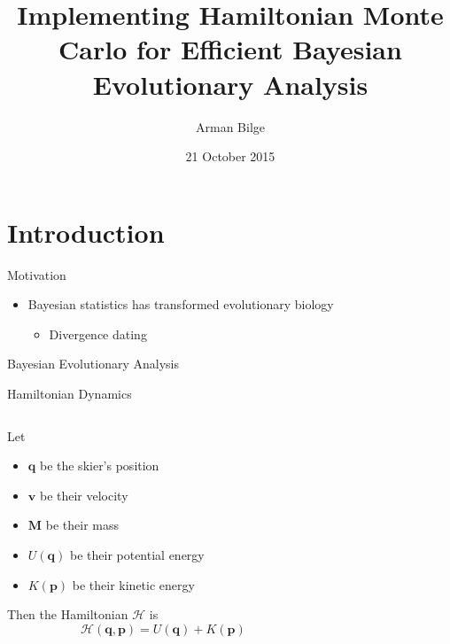 \documentclass{beamer}
\title{Implementing Hamiltonian Monte Carlo for Efficient Bayesian Evolutionary Analysis}
\author{Arman Bilge}
\institute{Computational Evolution Group \\ The University of Auckland}
\date{21 October 2015}
\renewcommand{\vec}[1]{\ensuremath{\boldsymbol{\mathbf{#1}}}}
\newcommand{\mat}[1]{\ensuremath{\boldsymbol{\mathbf{#1}}}}
\begin{document}
    \frame{\titlepage}

    \section{Introduction}

    \begin{frame}{Motivation}

        \begin{itemize}

            \item Bayesian statistics has transformed evolutionary biology
            \begin{itemize}
                \item Divergence dating
            \end{itemize}

        \end{itemize}

    \end{frame}

    \begin{frame}{Bayesian Evolutionary Analysis}
    \end{frame}

    \begin{frame}{Hamiltonian Dynamics}
        \begin{columns}
            \begin{column}{.5\textwidth}
                \begin{definition}
                    Let
                    \small
                    \begin{itemize}
                        \item $\vec{q}$ be the skier's position
                        \item $\vec{v}$ be their velocity
                        \item $\mat{M}$ be their mass
                        \item $U\left(\vec{q}\right)$ be their potential energy
                        \item $K\left(\vec{p}\right)$ be their kinetic energy
                    \end{itemize}

                    \normalsize
                    Then the Hamiltonian $\mathcal{H}$ is
                    \begin{equation*}
                        \mathcal{H}\left(\vec{q},\vec{p}\right) = U\left(\vec{q}\right) + K\left(\vec{p}\right)
                    \end{equation*}
                \end{definition}
            \end{column}
            \begin{column}{.5\textwidth}

            \end{column}
        \end{columns}
    \end{frame}
\end{document}
